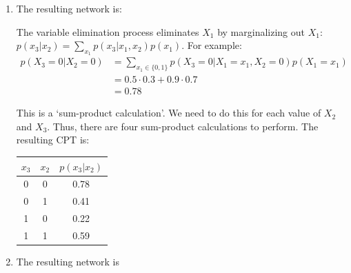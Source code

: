 \documentclass[12pt]{article}
\begin{document}
\begin{solution}

\begin{enumerate}
\item The resulting network is:
\begin{center}

\end{center}

The variable elimination process eliminates $X_1$ by marginalizing out $X_1$: $p(x_3 | x_2) = \sum_{x_1} p(x_3 | x_1, x_2) p(x_1)$. For example: 
\begin{align*}
    p(X_3 = 0 | X_2 = 0) &= \sum_{x_1\in\{0,1\}} p(X_3 = 0 | X_1 = x_1, X_2 = 0) p(X_1 = x_1)\\
    &= 0.5 \cdot 0.3 + 0.9 \cdot 0.7\\
    &= 0.78
\end{align*}

This is a `sum-product calculation'.
We need to do this for each value of $X_2$ and $X_3$. 
Thus, there are four sum-product calculations
to perform. 
The resulting CPT is:\\
%
\begin{center}
\begin{tabular}{|c|c|c|}
\hline
{$x_3$}&{$x_2$}&{$p(x_3 | x_2)$} \\
\hline
0&0&0.78\\
0&1&0.41\\
1&0&0.22\\
1&1&0.59\\
\hline
\end{tabular}
\end{center}
\medskip

\item The resulting network is 
\begin{center}

\end{center}
\end{enumerate}
\end{solution}
\end{document}
